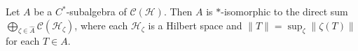 Let $A$ be a $C^*$-subalgebra of $\mathcal{C}(\mathcal{H})$. Then $A$ is $\ast$-isomorphic to the direct sum $\bigoplus_{\zeta \in \hat{A}} \mathcal{C}(\mathcal{H}_\zeta)$, where each $\mathcal{H}_\zeta$ is a Hilbert space and $\|T\| = \sup_\zeta \|\zeta(T)\|$ for each $T \in A$.

